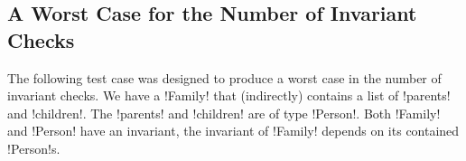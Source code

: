 

\subsection{A Worst Case for the Number of Invariant Checks}
\label{s:MoreCaseStudies}

The following test case was designed to produce a worst case in the number of invariant checks. We have a \Q!Family! that (indirectly) contains a list of \Q!parents! and \Q!children!. The \Q!parents! and \Q!children! are of type \Q!Person!. Both \Q!Family! and \Q!Person! have an invariant, the invariant of \Q!Family! depends on its contained \Q!Person!s.


